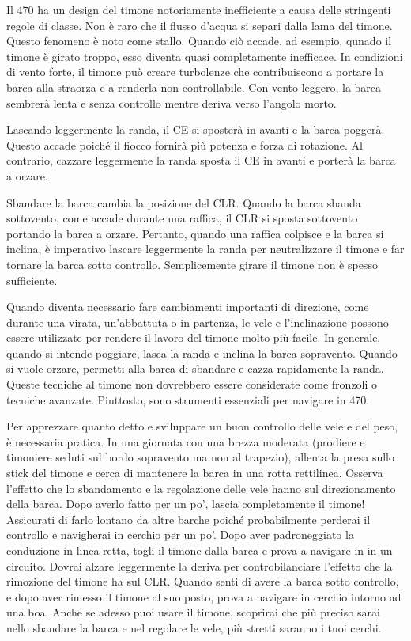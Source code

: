 Il 470 ha un design del timone notoriamente inefficiente a causa delle
stringenti regole di classe. Non è raro che il flusso d'acqua si separi dalla
lama del timone. Questo fenomeno è noto come stallo. Quando ciò accade, ad
esempio, qunado il timone è girato troppo, esso diventa quasi completamente
inefficace. In condizioni di vento forte, il timone può creare turbolenze che
contribuiscono a portare la barca alla straorza e a renderla non controllabile.
Con vento leggero, la barca sembrerà lenta e senza controllo mentre deriva verso
l'angolo morto.

Lascando leggermente la randa, il \ac{CE} si sposterà in avanti e la barca poggerà.
Questo accade poiché il fiocco fornirà più potenza e forza di rotazione. Al
contrario, cazzare leggermente la randa sposta il \ac{CE} in avanti e porterà la
barca a orzare.

Sbandare la barca cambia la posizione del \ac{CLR}. Quando la barca sbanda
sottovento, come accade durante una raffica, il \ac{CLR} si sposta sottovento
portando la barca a orzare. Pertanto, quando una raffica colpisce e la barca si
inclina, è imperativo lascare leggermente la randa per neutralizzare il
timone e far tornare la barca sotto controllo. Semplicemente girare il timone
non è spesso sufficiente.

Quando diventa necessario fare cambiamenti importanti di direzione, come durante
una virata, un'abbattuta o in partenza, le vele e l'inclinazione possono essere
utilizzate per rendere il lavoro del timone molto più facile. In generale,
quando si intende poggiare, lasca la randa e inclina la barca sopravento. Quando
si vuole orzare, permetti alla barca di sbandare e cazza rapidamente la randa.
Queste tecniche al timone non dovrebbero essere considerate come fronzoli o
tecniche avanzate. Piuttosto, sono strumenti essenziali per navigare in 470.

Per apprezzare quanto detto e sviluppare un buon controllo delle vele e del
peso, è necessaria pratica. In una giornata con una brezza moderata (prodiere e
timoniere seduti sul bordo sopravento ma non al trapezio), allenta la presa
sullo stick del timone e cerca di mantenere la barca in una rotta rettilinea.
Osserva l'effetto che lo sbandamento e la regolazione delle vele hanno sul
direzionamento della barca. Dopo averlo fatto per un po', lascia completamente
il timone! Assicurati di farlo lontano da altre barche poiché probabilmente
perderai il controllo e navigherai in cerchio per un po'. Dopo aver
padroneggiato la conduzione in linea retta, togli il timone dalla barca e prova
a navigare in in un circuito. Dovrai alzare leggermente la deriva per
controbilanciare l'effetto che la rimozione del timone ha sul \ac{CLR}. Quando
senti di avere la barca sotto controllo, e dopo aver rimesso il timone al suo
posto, prova a navigare in cerchio intorno ad una boa. Anche se adesso puoi
usare il timone, scoprirai che più preciso sarai nello sbandare la barca e nel
regolare le vele, più stretti saranno i tuoi cerchi.

